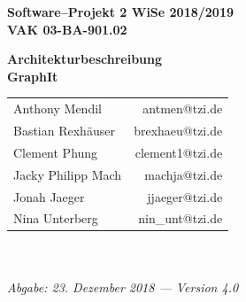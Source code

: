 \documentclass[enabledeprecatedfontcommands,fontsize=11pt,paper=a4,twoside]{scrartcl}
\begin{document}
  \thispagestyle{fancy}
  \fancyhead[LO,RE]{ }
  \fancyfoot[C]{}

  \vspace{3cm}

  \begin{minipage}[H]{\textwidth}
  \begin{center}
  \bf
  \Large
  Software--Projekt 2 WiSe 2018/2019\\
  \smallskip
  \small
  VAK 03-BA-901.02\\
  \vspace{3cm}
  \end{center}
  \end{minipage}
  \begin{minipage}[H]{\textwidth}
  \begin{center}
  \vspace{1cm}
  \bf
  \Large Architekturbeschreibung \\ 
  \vspace{1cm}
  \Huge\textbf{GraphIt}\normalsize
  \vfill
  \end{center}
  \end{minipage}
  \vfill
  \begin{minipage}[H]{\textwidth}
  \begin{center}
  \sf
  \begin{tabular}{lr}
  Anthony Mendil & antmen@tzi.de \\
  Bastian Rexhäuser & brexhaeu@tzi.de\\
  Clement Phung & clement1@tzi.de \\
  Jacky Philipp Mach & machja@tzi.de \\
  Jonah Jaeger & jjaeger@tzi.de \\
  Nina Unterberg & nin\_unt@tzi.de \\
  \end{tabular}
  \\ ~
  \vspace{2cm}
  \\
  \it Abgabe: 23. Dezember 2018 --- Version 4.0\\ ~
  \end{center}
  \end{minipage}

\thispagestyle{empty}
\cleardoublepage
\newpage
\end{document}

